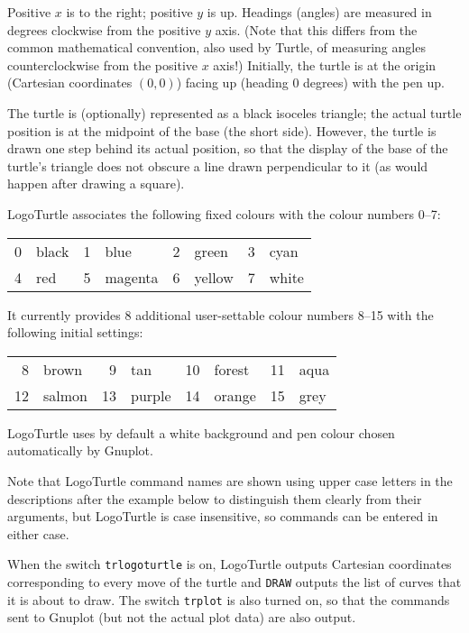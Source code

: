 Positive $x$ is to the right; positive $y$ is up.  Headings (angles)
are measured in degrees clockwise from the positive $y$ axis.  (Note
that this differs from the common mathematical convention, also used
by Turtle, of measuring angles counterclockwise from the positive $x$
axis!)  Initially, the turtle is at the origin (Cartesian coordinates
$(0,0)$) facing up (heading 0 degrees) with the pen up.

The turtle is (optionally) represented as a black isoceles triangle;
the actual turtle position is at the midpoint of the base (the short
side).  However, the turtle is drawn one step behind its actual
position, so that the display of the base of the turtle's triangle
does not obscure a line drawn perpendicular to it (as would happen
after drawing a square).

LogoTurtle associates the following fixed colours with the colour
numbers 0--7:
\begin{center}
  \begin{tabular}{rlrlrlrl}
    0 & black  &  1 & blue    &  2 & green  &  3 & cyan  \\
    4 & red    &  5 & magenta &  6 & yellow &  7 & white
  \end{tabular}
\end{center}
It currently provides 8 additional user-settable colour numbers 8--15
with the following initial settings:
\begin{center}
  \begin{tabular}{rlrlrlrl}
     8 & brown  &  9 & tan     & 10 & forest & 11 & aqua  \\
    12 & salmon & 13 & purple  & 14 & orange & 15 & grey
  \end{tabular}
\end{center}
LogoTurtle uses by default a white background and pen colour chosen
automatically by Gnuplot.

Note that LogoTurtle command names are shown using upper case letters
in the descriptions after the example below to distinguish them
clearly from their arguments, but LogoTurtle is case insensitive, so
commands can be entered in either case.

When the switch \texttt{trlogoturtle} is on, LogoTurtle outputs
Cartesian coordinates corresponding to every move of the turtle and
\texttt{DRAW} outputs the list of curves that it is about to draw.
The switch \texttt{trplot} is also turned on, so that the commands
sent to Gnuplot (but not the actual plot data) are also output.



